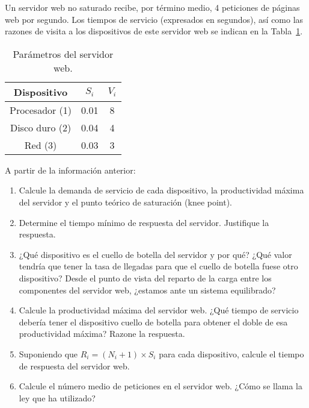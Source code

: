\begin{ejercicio}\label{ej:5.26}
    Un servidor web no saturado recibe, por término medio, 4 peticiones de páginas web por segundo. Los tiempos de servicio (expresados en segundos), así como las razones de visita a los dispositivos de este servidor web se indican en la Tabla~\ref{tab:5.26}.
    \begin{table}[h]
        \centering
        \begin{tabular}{|c|c|c|}
            \hline
            Dispositivo & $S_i$ & $V_i$ \\
            \hline
            Procesador (1) & 0.01 & 8 \\
            Disco duro (2) & 0.04 & 4 \\
            Red (3) & 0.03 & 3 \\
            \hline
        \end{tabular}
        \caption{Parámetros del servidor web.}
        \label{tab:5.26}
    \end{table}
    A partir de la información anterior:
    \begin{enumerate}
        \item Calcule la demanda de servicio de cada dispositivo, la productividad máxima del servidor y el punto teórico de saturación (knee point).
        \item Determine el tiempo mínimo de respuesta del servidor. Justifique la respuesta.
        \item ¿Qué dispositivo es el cuello de botella del servidor y por qué? ¿Qué valor tendría que tener la tasa de llegadas para que el cuello de botella fuese otro dispositivo? Desde el punto de vista del reparto de la carga entre los componentes del servidor web, ¿estamos ante un sistema equilibrado?
        \item Calcule la productividad máxima del servidor web. ¿Qué tiempo de servicio debería tener el dispositivo cuello de botella para obtener el doble de esa productividad máxima? Razone la respuesta.
        \item Suponiendo que $R_i = (N_i + 1) \times S_i$ para cada dispositivo, calcule el tiempo de respuesta del servidor web.
        \item Calcule el número medio de peticiones en el servidor web. ¿Cómo se llama la ley que ha utilizado?
    \end{enumerate}
\end{ejercicio}
